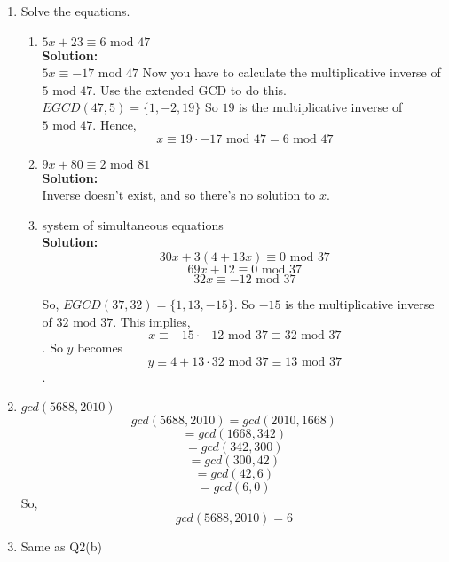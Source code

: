 \documentclass[11pt]{article}
\begin{document}
\begin{enumerate}
\begin{enumerate}
				\item Solve the equations. 
				
					\begin{enumerate}
						\item $5x + 23 \equiv 6 \text{  mod } 47$ \\
						\textbf{Solution: }\\
						$5x \equiv -17 \text{ mod } 47$
						Now you have to calculate the multiplicative inverse of $5 \text{ mod } 47$. Use the extended GCD to do this. 
						$EGCD(47, 5) = \{1, -2, 19\}$
						So $19$ is the multiplicative inverse of $5 \text{ mod } 47$. Hence, 
						$$x \equiv 19 \cdot -17 \text{ mod } 47 = 6 \text{ mod } 47$$
						
						\item $9x + 80 \equiv 2 \text{  mod } 81$ \\
						\textbf{Solution: }\\
						Inverse doesn't exist, and so there's no solution to $x$.
						
						\item system of simultaneous equations \\
						\textbf{Solution: }\\
						$$30x + 3(4 + 13x) \equiv 0 \text{ mod } 37$$
						$$69x + 12 \equiv 0 \text{ mod } 37$$
						$$32x \equiv −12 \text{ mod } 37$$
						
						So, $EGCD(37, 32) = \{1, 13, -15 \}$. So $-15$ is the multiplicative inverse of $32 \text{ mod } 37$. This implies, 
						$$x \equiv -15 \cdot -12 \text{ mod } 37 \equiv 32 \text{ mod } 37$$. So $y$ becomes 
						$$y \equiv 4 + 13 \cdot 32 \text{ mod } 37 \equiv 13 \text{ mod } 37$$.
						
					\end{enumerate}
				
				\item $gcd(5688, 2010)$
						$$gcd(5688, 2010) = gcd(2010,1668)$$
						$$= gcd(1668, 342)$$
						$$= gcd(342, 300)$$
						$$= gcd(300, 42)$$
						$$= gcd(42, 6)$$
						$$= gcd(6,0)$$
				So, 
						$$gcd(5688, 2010) = 6$$
					
				\item Same as Q2(b)
				
				
			\end{enumerate}
			
			
		
		
	\end{enumerate}
	
	
	
	
\end{document}
